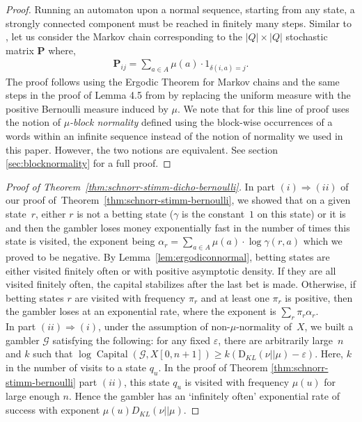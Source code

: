 \documentclass[11pt]{article}
\newcommand{\G}{\mathcal{G}}
\DeclareMathOperator{\capital}{Capital}
\begin{document}
\begin{proof}
	Running an automaton upon a normal sequence, starting from any state, a strongly connected component must be reached in finitely many steps. Similar to \cite{SeillerS2020}, let us consider the Markov chain corresponding to the $\lvert Q \rvert \times \lvert Q \rvert$ stochastic matrix $\mathbf{P}$ where,
\begin{align*}
\mathbf{P}_{ij}=\sum\limits_{a \in A} \mu(a) \cdot 1_{\delta(i,a)=j}.	
\end{align*}
The proof follows using the Ergodic Theorem for Markov chains and the same steps in the proof of Lemma 4.5 from \cite{SchnorrS1972} by replacing the uniform measure with the positive Bernoulli measure induced by $\mu$. We note that for this line of proof uses the notion of \emph{$\mu$-block normality} defined using the block-wise occurrences of a words within an infinite sequence instead of the notion of normality we used in this paper. However, the two notions are equivalent. See section \ref{sec:blocknormality} for a full proof.  
\end{proof}



\begin{proof}[Proof of Theorem~\ref{thm:schnorr-stimm-dicho-bernoulli}]
In part $(i) \Rightarrow (ii)$ of our proof of~Theorem~\ref{thm:schnorr-stimm-bernoulli}, we showed that on a given state~$r$, either $r$ is not a betting state  ($\gamma$ is the constant~$1$ on this state) or it is and then the gambler  loses money exponentially fast in the number of times this state is visited, the exponent being $\alpha_r = \sum_{a \in A} \mu(a)\cdot  \log \gamma(r,a)$ which we proved to be negative. By Lemma~\ref{lem:ergodiconnormal}, betting states are either visited finitely often or with positive asymptotic density. If they are all visited finitely often, the capital stabilizes after the last bet is made. Otherwise, if betting states $r$ are visited with frequency $\pi_r$ and at least one $\pi_r$ is positive, then the gambler loses at an exponential rate, where the exponent is $\sum_r \pi_r \alpha_r$.\\

In part $(ii) \Rightarrow (i)$, under the assumption of non-$\mu$-normality of~$X$, we built a gambler $\G$ satisfying the following: for any fixed $\varepsilon$, there are arbitrarily large~$n$ and $k$ such that $
\log \capital(\G,X[0,n+1]) \geq k \left( \mathrm{D}_{KL}(\nu || \mu) - \varepsilon \right)$. Here, $k$ in the number of visits to a state $q_u$. In the proof of Theorem \ref{thm:schnorr-stimm-bernoulli} part $(ii)$, this state $q_u$ is visited with frequency $\mu(u)$ for large enough $n$. Hence the gambler has an `infinitely often' exponential rate of success with exponent $\mu(u) D_{KL}(\nu || \mu)$. 
\end{proof}
\end{document}
